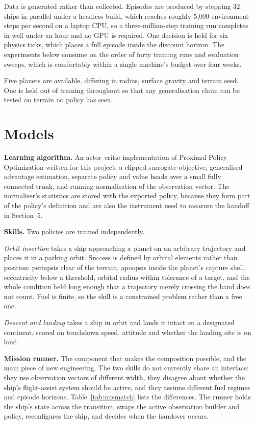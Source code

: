 \documentclass[11pt]{article}
\begin{document}
Data is generated rather than collected. Episodes are produced by stepping 32 ships in
parallel under a headless build, which reaches roughly 5{,}000 environment steps per
second on a laptop CPU, so a three-million-step training run completes in well under
an hour and no GPU is required. One decision is held for six physics ticks, which
places a full episode inside the discount horizon. The experiments below consume on
the order of forty training runs and evaluation sweeps, which is comfortably within a
single machine's budget over four weeks.

Five planets are available, differing in radius, surface gravity and terrain seed.
One is held out of training throughout so that any generalisation claim can be tested
on terrain no policy has seen.

\section{Models}

\textbf{Learning algorithm.} An actor--critic implementation of Proximal Policy
Optimization \cite{schulman2017} written for this project: a clipped surrogate
objective, generalised advantage estimation, separate policy and value heads over a
small fully connected trunk, and running normalisation of the observation vector. The
normaliser's statistics are stored with the exported policy, because they form part of
the policy's definition and are also the instrument used to measure the handoff in
Section~5.

\textbf{Skills.} Two policies are trained independently.

\emph{Orbit insertion} takes a ship approaching a planet on an arbitrary trajectory
and places it in a parking orbit. Success is defined by orbital elements rather than
position: periapsis clear of the terrain, apoapsis inside the planet's capture shell,
eccentricity below a threshold, orbital radius within tolerance of a target, and the
whole condition held long enough that a trajectory merely crossing the band does not
count. Fuel is finite, so the skill is a constrained problem rather than a free one.

\emph{Descent and landing} takes a ship in orbit and lands it intact on a designated
continent, scored on touchdown speed, attitude and whether the landing site is on land.

\textbf{Mission runner.} The component that makes the composition possible, and the
main piece of new engineering. The two skills do not currently share an interface: they
use observation vectors of different width, they disagree about whether the ship's
flight-assist system should be active, and they assume different fuel regimes and
episode horizons. Table~\ref{tab:mismatch} lists the differences. The runner holds the
ship's state across the transition, swaps the active observation builder and policy,
reconfigures the ship, and decides when the handover occurs.
\end{document}
